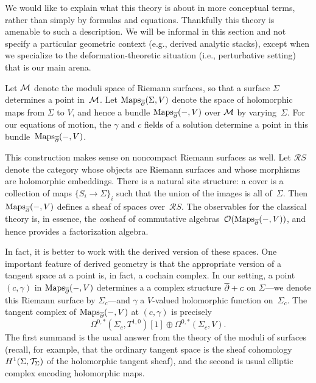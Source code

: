 We would like to explain what this theory is about in more conceptual terms,
rather than simply by formulas and equations.
Thankfully this theory is amenable to such a description.
We will be informal in this section and not specify a particular geometric context (e.g., derived analytic stacks),
except when we specialize to the deformation-theoretic situation (i.e., perturbative setting) that is our main arena.

\def\Maps{\operatorname{Maps}}

Let $\mathcal M$ denote the moduli space of Riemann surfaces,
so that a surface $\Sigma$ determines a point in~$\mathcal M$.
Let $\Maps_{\dbar}(\Sigma,V)$ denote the space of holomorphic maps from $\Sigma$ to $V$,
and hence a bundle $\Maps_{\dbar}(-,V)$ over $\mathcal M$ by varying~$\Sigma$.
For our equations of motion, the $\gamma$ and $c$ fields of a solution determine a point in this bundle~$\Maps_{\dbar}(-,V)$.

\def\RS{{\mathcal RS}}

This construction makes sense on noncompact Riemann surfaces as well.
Let $\RS$ denote the category whose objects are Riemann surfaces and whose morphisms are holomorphic embeddings.
There is a natural site structure: a cover is a collection of maps $\{S_i \to \Sigma\}_i$ such that the union of the images is all of~$\Sigma$.
Then $\Maps_{\dbar}(-,V)$ defines a sheaf of spaces over~$\RS$.
The observables for the classical theory is, in essence, the {\em co}\/sheaf of commutative algebras~$\cO(\Maps_{\dbar}(-,V))$,
and hence provides a factorization algebra.

In fact, it is better to work with the derived version of these spaces.
One important feature of derived geometry is that the appropriate version of a tangent space at a point is, in fact, a cochain complex.
In our setting, a point $(c,\gamma)$ in $\Maps_{\dbar}(-,V)$ determines a a complex structure $\overline{\partial} + c$ on $\Sigma$---we denote this Riemann surface by $\Sigma_c$---and $\gamma$ a $V$-valued holomorphic function on~$\Sigma_c$.
The tangent complex of $\Maps_{\dbar}(-,V)$ at $(c,\gamma)$ is precisely 
\[
\Omega^{0,*}(\Sigma_c,T^{1,0})[1] \oplus \Omega^{0,*}(\Sigma_c,V).
\]
The first summand is the usual answer from the theory of the moduli of surfaces 
(recall, for example, that the ordinary tangent space is the sheaf cohomology $H^1(\Sigma,\mathcal T_\Sigma)$ of the holomorphic tangent sheaf),
and the second is usual elliptic complex encoding holomorphic maps.

